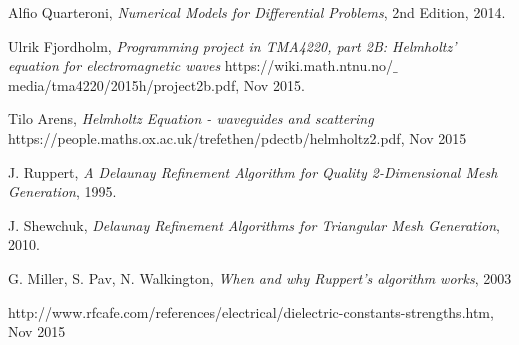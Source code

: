 \documentclass[10pt,a4paper]{article}
\begin{document}
\begin{thebibliography}{}

Alfio Quarteroni, \emph{Numerical Models for Differential Problems}, 2nd Edition, 2014.

Ulrik Fjordholm, \emph{Programming project in TMA4220, part 2B:
Helmholtz' equation for electromagnetic waves} https://wiki.math.ntnu.no/$\_$media/tma4220/2015h/project2b.pdf, Nov 2015.

Tilo Arens, \emph{Helmholtz Equation - waveguides and scattering} https://people.maths.ox.ac.uk/trefethen/pdectb/helmholtz2.pdf, Nov 2015

J. Ruppert, \emph{A Delaunay Refinement Algorithm for Quality 2-Dimensional Mesh Generation}, 1995.

J. Shewchuk, \emph{Delaunay Refinement Algorithms for Triangular Mesh Generation}, 2010.

G. Miller, S. Pav, N. Walkington, \emph{When and why Ruppert's algorithm works}, 2003

http://www.rfcafe.com/references/electrical/dielectric-constants-strengths.htm, Nov 2015

\end{thebibliography}
\end{document}
